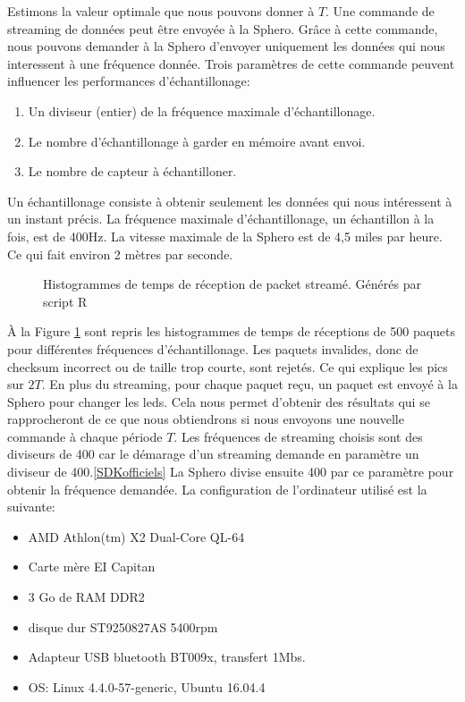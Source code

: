 Estimons la valeur optimale que nous pouvons donner à $T$.
Une commande de streaming de données peut être envoyée à la Sphero.
Grâce à cette commande, nous pouvons demander à la Sphero d'envoyer uniquement les données qui nous interessent à une fréquence donnée.
Trois paramètres de cette commande peuvent influencer les performances d'échantillonage:
\begin{enumerate}
 \item Un diviseur (entier) de la fréquence maximale d'échantillonage.
 \item Le nombre d'échantillonage à garder en mémoire avant envoi.
 \item Le nombre de capteur à échantilloner.
\end{enumerate}
Un échantillonage consiste à obtenir seulement les données qui nous intéressent à un instant précis.
La fréquence maximale d'échantillonage, un échantillon à la fois, est de 400Hz.\cite{SDKofficiels}
La vitesse maximale de la Sphero est de 4,5 miles par heure.\cite{product} Ce qui fait environ 2 mètres par seconde.
\begin{figure}
 \centering
 \caption{Histogrammes de temps de réception de packet streamé. Générés par script R}
 \label{histogrammes}
\end{figure}

À la Figure \ref{histogrammes} sont repris les histogrammes de temps de réceptions de 500 paquets pour différentes fréquences d'échantillonage.
Les paquets invalides, donc de checksum incorrect ou de taille trop courte, sont rejetés.
Ce qui explique les pics sur $2T$.
En plus du streaming, pour chaque paquet reçu, un paquet est envoyé à la Sphero pour changer les leds.
Cela nous permet d'obtenir des résultats qui se rapprocheront de ce que nous obtiendrons si nous envoyons une nouvelle commande à chaque période $T$.
Les fréquences de streaming choisis sont des diviseurs de 400 car le démarage d'un streaming demande en paramètre un diviseur de 400.\ref{SDKofficiels}
La Sphero divise ensuite 400 par ce paramètre pour obtenir la fréquence demandée.
La configuration de l'ordinateur utilisé est la suivante:
\begin{itemize}
 \item AMD Athlon(tm) X2 Dual-Core QL-64
 \item Carte mère EI Capitan
 \item 3 Go de RAM DDR2
 \item disque dur ST9250827AS 5400rpm
 \item Adapteur USB bluetooth BT009x, transfert 1Mbs.
 \item OS: Linux 4.4.0-57-generic, Ubuntu 16.04.4
\end{itemize}

